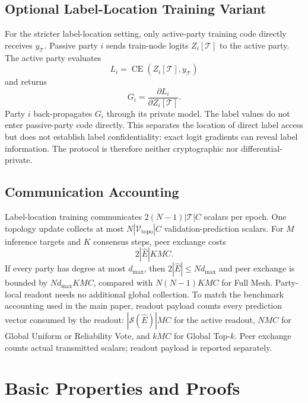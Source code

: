 \documentclass[letterpaper]{article}
\begin{document}
\subsection{Optional Label-Location Training Variant}

For the stricter label-location setting, only active-party training code directly
receives $y_{\mathcal{T}}$. Passive party $i$ sends train-node logits
$Z_i[\mathcal{T}]$ to the active party. The active party evaluates
\begin{equation}
L_i=\operatorname{CE}(Z_i[\mathcal{T}],y_{\mathcal{T}})
\end{equation}
and returns
\begin{equation}
G_i=\frac{\partial L_i}{\partial Z_i[\mathcal{T}]}.
\end{equation}
Party $i$ back-propagates $G_i$ through its private model. The label values do
not enter passive-party code directly. This separates the location of direct
label access but does not establish label confidentiality: exact logit gradients
can reveal label information. The protocol is therefore neither cryptographic
nor differential-private.

\subsection{Communication Accounting}

Label-location training communicates
$2(N-1)|\mathcal{T}|C$ scalars per epoch. One topology update collects at most
$N|\mathcal{V}_{\mathrm{topo}}|C$ validation-prediction scalars. For $M$
inference targets and $K$ consensus steps, peer exchange costs
\begin{equation}
2|\widehat E|KMC.
\end{equation}
If every party has degree at most $d_{\max}$, then
$2|\widehat E|\le Nd_{\max}$ and peer exchange is bounded by
$Nd_{\max}KMC$, compared with $N(N-1)KMC$ for Full Mesh. Party-local readout
needs no additional global collection. To match the benchmark accounting used
in the main paper, readout payload counts every prediction vector consumed by
the readout: $|\mathcal{S}(\widehat E)|MC$ for the active readout, $NMC$ for
Global Uniform or Reliability Vote, and $kMC$ for Global Top-$k$. Peer exchange
counts actual transmitted scalars; readout payload is reported separately.


\section{Basic Properties and Proofs}
\end{document}

